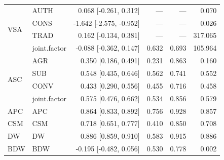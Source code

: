 \begin{table}[htbp]
\begin{tabular}{llrrrr}
\multirow{4}{*}{VSA} & \quad AUTH & 0.068 [-0.261, 0.312] & --- & --- & 0.070 \\
 & \quad CONS & -1.642 [-2.575, -0.952] & --- & --- & 0.026 \\
 & \quad TRAD & 0.162 [-0.134, 0.381] & --- & --- & 317.065 \\
 & \quad joint.factor & -0.088 [-0.362, 0.147] & 0.632 & 0.693 & 105.964 \\
\hline
\multirow{4}{*}{ASC} & \quad AGR & 0.350 [0.186, 0.491] & 0.231 & 0.863 & 0.160 \\
 & \quad SUB & 0.548 [0.435, 0.646] & 0.562 & 0.741 & 0.552 \\
 & \quad CONV & 0.433 [0.290, 0.556] & 0.455 & 0.716 & 0.458 \\
 & \quad joint.factor & 0.575 [0.476, 0.662] & 0.534 & 0.856 & 0.579 \\
\hline
APC & \quad APC & 0.864 [0.833, 0.892] & 0.756 & 0.928 & 0.857 \\
\hline
CSM & \quad CSM & 0.718 [0.651, 0.777] & 0.410 & 0.850 & 0.708 \\
\hline
DW & \quad DW & 0.886 [0.859, 0.910] & 0.583 & 0.915 & 0.886 \\
\hline
BDW & \quad BDW & -0.195 [-0.482, 0.056] & 0.530 & 0.778 & 0.002 \\
\hline\end{tabular}
\end{table}
